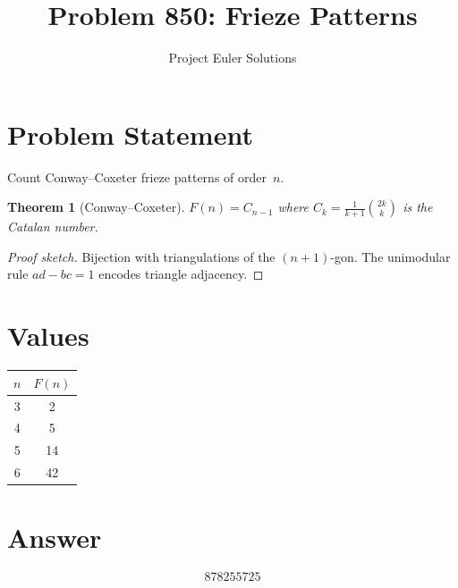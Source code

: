 \documentclass[11pt]{article}
\title{Problem 850: Frieze Patterns}
\author{Project Euler Solutions}
\date{}
\newtheorem{theorem}{Theorem}
\begin{document}
\maketitle
\section{Problem Statement}
Count Conway--Coxeter frieze patterns of order~$n$.
\begin{theorem}[Conway--Coxeter]
$F(n) = C_{n-1}$ where $C_k = \frac{1}{k+1}\binom{2k}{k}$ is the Catalan number.
\end{theorem}
\begin{proof}[Proof sketch]
Bijection with triangulations of the $(n+1)$-gon. The unimodular rule $ad - bc = 1$ encodes triangle adjacency.
\end{proof}
\section{Values}
\begin{center}
\begin{tabular}{cc} \toprule $n$ & $F(n)$ \\ \midrule 3 & 2 \\ 4 & 5 \\ 5 & 14 \\ 6 & 42 \\ \bottomrule \end{tabular}
\end{center}
\section{Answer}

\[
\boxed{878255725}
\]
\end{document}
